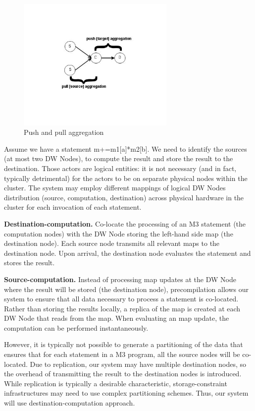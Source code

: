 \documentclass{sig-semester}
\def\M3{M3\xspace}
\begin{document}
\begin{figure}
\begin{center}
\includegraphics[width=3in]{pushPull.jpg}
\vspace{-21mm}
\caption{Push and pull aggregation}
\label{fig:pushPull}
\vspace{-6mm}
\end{center}
\end{figure}

Assume we have a statement m+=m1[a]*m2[b]. We need to identify the sources (at most two DW Nodes), to compute the result and store the result to the destination. Those actors are logical entities: it is not necessary (and in fact, typically detrimental) for the actors to be on separate physical nodes within the cluster. The system may employ different mappings of logical DW Nodes distribution (source, computation, destination) across physical hardware in the cluster for each invocation of each statement.

\textbf{Destination-computation.}
Co-locate the processing of an \M3 statement (the computation nodes) with the DW Node storing the left-hand side map (the destination node). Each source node transmits all relevant maps to the destination node. Upon arrival, the destination node evaluates the statement and stores the result.

\textbf{Source-computation.} Instead of processing map updates at the DW Node where the result will be stored (the destination node), precompilation allows our system to ensure that all data necessary to process a statement is co-located. Rather than storing the results locally, a replica of the map is created at each DW Node that reads from the map. When evaluating an map update, the computation can be performed instantaneously.

However, it is typically not possible to generate a partitioning of the data that ensures that for each statement in a \M3 program, all the source nodes will be co-located. Due to replication, our system may have multiple destination nodes, so the overhead of transmitting the result to the destination nodes is introduced. While replication is typically a desirable characteristic, storage-constraint infrastructures may need to use complex partitioning schemes. Thus, our system will use destination-computation approach.
\end{document}

